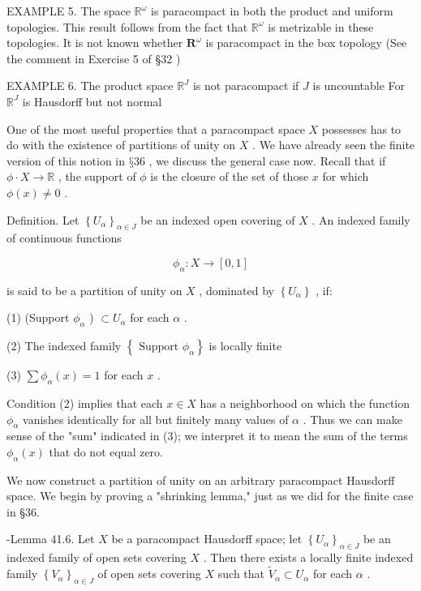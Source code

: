EXAMPLE 5. The space \({\mathbb{R}}^{\omega }\) is paracompact in both the product and uniform topologies. This result follows from the fact that \({\mathbb{R}}^{\omega }\) is metrizable in these topologies. It is not known whether \({\mathbf{R}}^{\omega }\) is paracompact in the box topology (See the comment in Exercise 5 of §32 )

EXAMPLE 6. The product space \({\mathbb{R}}^{J}\) is not paracompact if \(J\) is uncountable For \({\mathbb{R}}^{J}\) is Hausdorff but not normal

One of the most useful properties that a paracompact space \(X\) possesses has to do with the existence of partitions of unity on \(X\) . We have already seen the finite version of this notion in \(§{36}\) , we discuss the general case now. Recall that if \(\phi  \cdot  X \rightarrow  \mathbb{R}\) , the support of \(\phi\) is the closure of the set of those \(x\) for which \(\phi \left( x\right)  \neq  0\) .

Definition. Let \({\left\{  {U}_{\alpha }\right\}  }_{\alpha  \in  J}\) be an indexed open covering of \(X\) . An indexed family of continuous functions

\[
{\phi }_{\alpha } : X \rightarrow  \left\lbrack  {0,1}\right\rbrack
\]

is said to be a partition of unity on \(X\) , dominated by \(\left\{  {U}_{\alpha }\right\}\) , if:

(1) (Support \({\phi }_{\alpha }\) ) \(\subset  {U}_{\alpha }\) for each \(\alpha\) .

(2) The indexed family \(\left\{  {\text{ Support }{\phi }_{\alpha }}\right\}\) is locally finite

(3) \(\sum {\phi }_{\alpha }\left( x\right)  = 1\) for each \(x\) .

Condition (2) implies that each \(x \in  X\) has a neighborhood on which the function \({\phi }_{\alpha }\) vanishes identically for all but finitely many values of \(\alpha\) . Thus we can make sense of the "sum" indicated in (3); we interpret it to mean the sum of the terms \({\phi }_{\alpha }\left( x\right)\) that do not equal zero.

We now construct a partition of unity on an arbitrary paracompact Hausdorff space. We begin by proving a "shrinking lemma," just as we did for the finite case in §36.

-Lemma 41.6. Let \(X\) be a paracompact Hausdorff space; let \({\left\{  {U}_{\alpha }\right\}  }_{\alpha  \in  J}\) be an indexed family of open sets covering \(X\) . Then there exists a locally finite indexed family \({\left\{  {V}_{\alpha }\right\}  }_{\alpha  \in  J}\) of open sets covering \(X\) such that \({\widetilde{V}}_{\alpha } \subset  {U}_{\alpha }\) for each \(\alpha\) .

